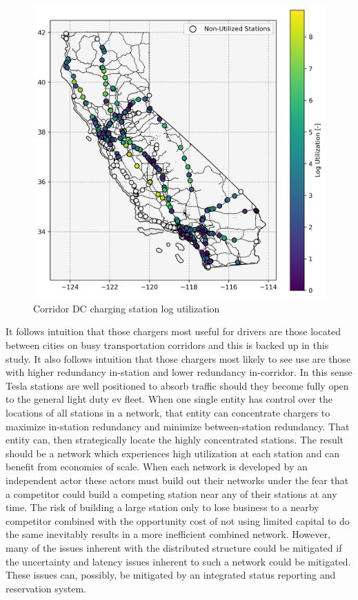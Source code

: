 \documentclass[11pt]{article}
\begin{document}
\begin{multicols}{2}
\begin{figure}[H]
	\centering
	\includegraphics[width = \linewidth]{figs/California_SNG_Utilization.png}
	\caption{Corridor DC charging station log utilization}
	\label{fig:utilized_stations}
\end{figure}

It follows intuition that those chargers most useful for drivers are those located between cities on busy transportation corridors and this is backed up in this study. It also follows intuition that those chargers most likely to see use are those with higher redundancy in-station and lower redundancy in-corridor. In this sense Tesla stations are well positioned to absorb traffic should they become fully open to the general light duty \gls{ev} fleet. When one single entity has control over the locations of all stations in a network, that entity can concentrate chargers to maximize in-station redundancy and minimize between-station redundancy. That entity can, then strategically locate the highly concentrated stations. The result should be a network which experiences high utilization at each station and can benefit from economies of scale. When each network is developed by an independent actor these actors must build out their networks under the fear that a competitor could build a competing station near any of their stations at any time. The risk of building a large station only to lose business to a nearby competitor combined with the opportunity cost of not using limited capital to do the same inevitably results in a more inefficient combined network. However, many of the issues inherent with the distributed structure could be mitigated if the uncertainty and latency issues inherent to such a network could be mitigated. These issues can, possibly, be mitigated by an integrated status reporting and reservation system.



\end{multicols}
\end{document}
